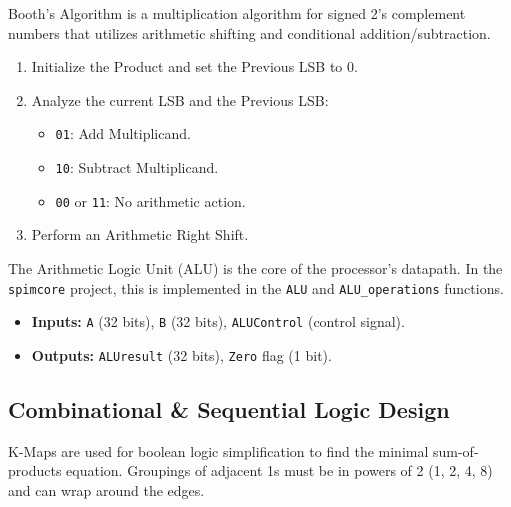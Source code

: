 \begin{remark}
Booth's Algorithm is a multiplication algorithm for signed 2's complement numbers that utilizes arithmetic shifting and conditional addition/subtraction.

\begin{enumerate}
    \item Initialize the Product and set the Previous LSB to 0.
    \item Analyze the current LSB and the Previous LSB:
    \begin{itemize}
        \item \texttt{01}: Add Multiplicand.
        \item \texttt{10}: Subtract Multiplicand.
        \item \texttt{00} or \texttt{11}: No arithmetic action.
    \end{itemize}
    \item Perform an Arithmetic Right Shift.
\end{enumerate}
\end{remark}

\begin{vocabulary}
The Arithmetic Logic Unit (ALU) is the core of the processor's datapath. In the \texttt{spimcore} project, this is implemented in the \texttt{ALU} and \texttt{ALU\_operations} functions.

\begin{itemize}
    \item \textbf{Inputs:} \texttt{A} (32 bits), \texttt{B} (32 bits), \texttt{ALUControl} (control signal).
    \item \textbf{Outputs:} \texttt{ALUresult} (32 bits), \texttt{Zero} flag (1 bit).
\end{itemize}
\end{vocabulary}

\subsection{Combinational \& Sequential Logic Design}

\begin{remark}
K-Maps are used for boolean logic simplification to find the minimal sum-of-products equation. Groupings of adjacent 1s must be in powers of 2 (1, 2, 4, 8) and can wrap around the edges.
\end{remark}

